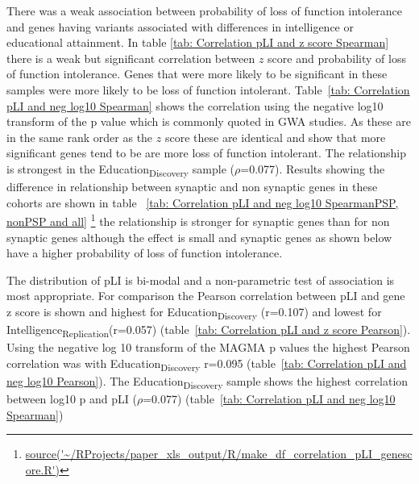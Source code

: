 There was a weak association between probability of loss of function intolerance and genes having variants associated with differences in intelligence or educational attainment. In table \ref{tab: Correlation pLI and z score Spearman} there is a weak but significant correlation between $z$ score and probability of loss of function intolerance. Genes that were more likely to be significant in these samples were more likely to be loss of function intolerant. Table~\ref{tab: Correlation pLI and neg log10 Spearman} shows the correlation using the negative log10 transform of the p value which is commonly quoted in GWA studies. As these are in the same rank order as the $z$ score these are identical and show that more significant genes tend to be are more loss of function intolerant. The relationship is strongest in the Education\textsubscript{Discovery} sample ($\rho$=0.077). Results showing the difference in relationship between synaptic and non synaptic genes in these cohorts are shown in table ~\ref{tab: Correlation pLI and neg log10 SpearmanPSP, nonPSP and all}  \footnote{\url{source('~/RProjects/paper_xls_output/R/make_df_correlation_pLI_genescore.R')}} the relationship is stronger for synaptic genes than for non synaptic genes although the effect is small and synaptic genes as shown below have a higher probability of loss of function intolerance.

The distribution of pLI is bi-modal and a non-parametric test of association is most appropriate. For comparison the Pearson correlation between pLI and gene z score is shown and highest for Education\textsubscript{Discovery} (r=0.107) and lowest for Intelligence\textsubscript{Replication}(r=0.057) (table~\ref{tab: Correlation pLI and z score Pearson}). Using the negative log 10 transform of the MAGMA p values the highest Pearson correlation was with Education\textsubscript{Discovery} r=0.095 (table~\ref{tab: Correlation pLI and neg log10 Pearson}). The Education\textsubscript{Discovery} sample shows the highest correlation between log10 p and pLI ($\rho$=0.077) (table~\ref{tab: Correlation pLI and neg log10 Spearman})







